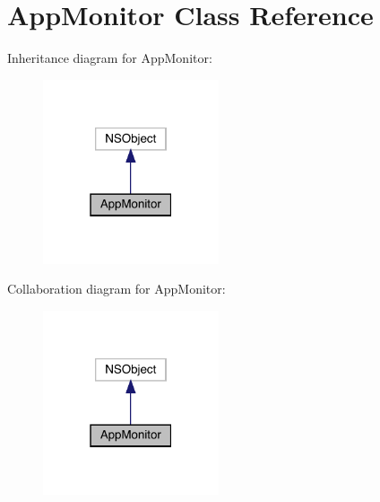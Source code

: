 \hypertarget{interface_app_monitor}{}\section{App\+Monitor Class Reference}
\label{interface_app_monitor}


Inheritance diagram for App\+Monitor\+:\nopagebreak
\begin{figure}[H]
\begin{center}
\leavevmode
\includegraphics[width=147pt]{interface_app_monitor__inherit__graph}
\end{center}
\end{figure}


Collaboration diagram for App\+Monitor\+:\nopagebreak
\begin{figure}[H]
\begin{center}
\leavevmode
\includegraphics[width=147pt]{interface_app_monitor__coll__graph}
\end{center}
\end{figure}
